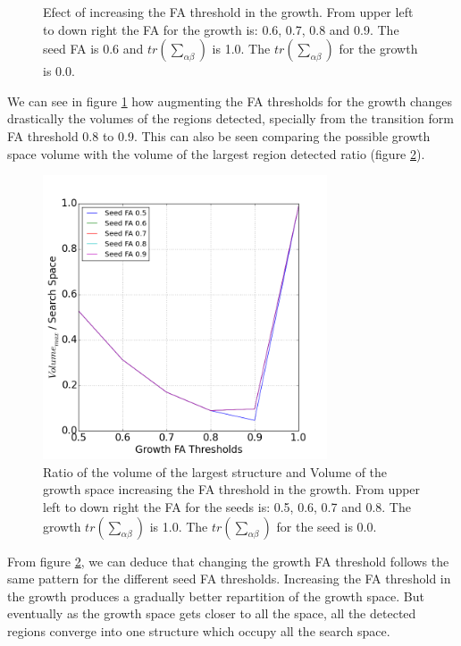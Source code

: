\documentclass[12pt]{article}
\begin{document}
\begin{figure}[ht]
\begin{minipage}{.45\textwidth}
\end{minipage}
\caption{Efect of increasing the FA threshold in the growth. From upper left to down right the FA for the growth is: 0.6, 0.7, 0.8 and 0.9. The seed FA is 0.6 and $tr \left(\sum_{\alpha\beta}\right)$ is 1.0. The $tr \left(\sum_{\alpha\beta}\right)$ for the growth is 0.0.} \label{fg:3D_FA_growth}
\end{figure}
\FloatBarrier

\begin{par}
 We can see in figure \ref{fg:3D_FA_growth} how augmenting the FA thresholds for the growth changes drastically the volumes of the regions detected, specially from the transition form FA threshold 0.8 to 0.9. This can also be seen comparing the possible growth space volume with the volume of the largest region detected ratio (figure \ref{fg:vol_FA_growth}).
\end{par}

\begin{figure}[ht]
\centering
  \includegraphics[width=0.75\textwidth]{groups/volumeplots/volumes_growth_FA_All_WITH_ZERO.png}
	
\caption{Ratio of the volume of the largest structure and Volume of the growth space  increasing the FA threshold in the growth. From upper left to down right the FA for the seeds is: 0.5, 0.6, 0.7 and 0.8. The growth $tr \left(\sum_{\alpha\beta}\right)$ is 1.0. The $tr \left(\sum_{\alpha\beta}\right)$ for the seed is 0.0.} \label{fg:vol_FA_growth}
\end{figure}
\FloatBarrier

\begin{par}
From figure \ref{fg:vol_FA_growth}, we can deduce
 that changing the growth FA threshold follows the
  same pattern for the different seed FA
   thresholds. Increasing the FA threshold in the
    growth produces a gradually better repartition
     of the growth space. But eventually as the
      growth space gets closer to all the space,
       all the detected regions converge into one
        structure which occupy all the search
         space.
\end{par}
\end{document}

